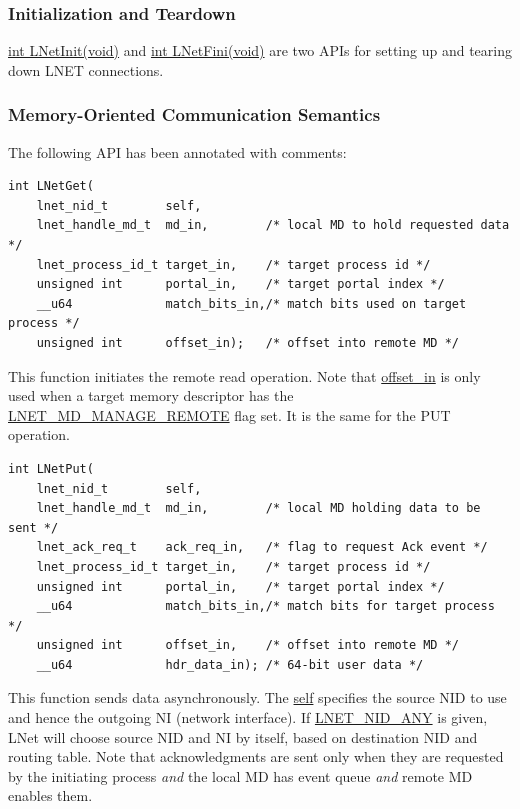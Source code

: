 \subsubsection*{Initialization and Teardown}

\url{int LNetInit(void)} and \url{int LNetFini(void)} are two APIs for
setting up and tearing down LNET connections.


\subsubsection*{Memory-Oriented Communication Semantics}

The following API has been annotated with comments:

\begin{Verbatim}
int LNetGet(
    lnet_nid_t        self,
    lnet_handle_md_t  md_in,        /* local MD to hold requested data */
    lnet_process_id_t target_in,    /* target process id */
    unsigned int      portal_in,    /* target portal index */
    __u64             match_bits_in,/* match bits used on target process */ 
    unsigned int      offset_in);   /* offset into remote MD */
\end{Verbatim}

This function initiates the remote read operation.  Note that \url{offset_in}
is only used when a target memory descriptor has the \url{LNET_MD_MANAGE_REMOTE}
flag set. It is the same for the PUT operation.

\begin{Verbatim}
int LNetPut(
    lnet_nid_t        self,
    lnet_handle_md_t  md_in,        /* local MD holding data to be sent */ 
    lnet_ack_req_t    ack_req_in,   /* flag to request Ack event */
    lnet_process_id_t target_in,    /* target process id */
    unsigned int      portal_in,    /* target portal index */
    __u64             match_bits_in,/* match bits for target process */
    unsigned int      offset_in,    /* offset into remote MD */
    __u64             hdr_data_in); /* 64-bit user data */
\end{Verbatim}

This function sends data asynchronously. The \url{self} specifies the
source NID to use and hence the outgoing NI (network interface).  If
\url{LNET_NID_ANY} is given, LNet will choose source NID and NI by itself,
based on destination NID and routing table.  Note that acknowledgments are
sent only when they are requested by the initiating process \textit{and} the
local MD has event queue \textit{and} remote MD enables them.

